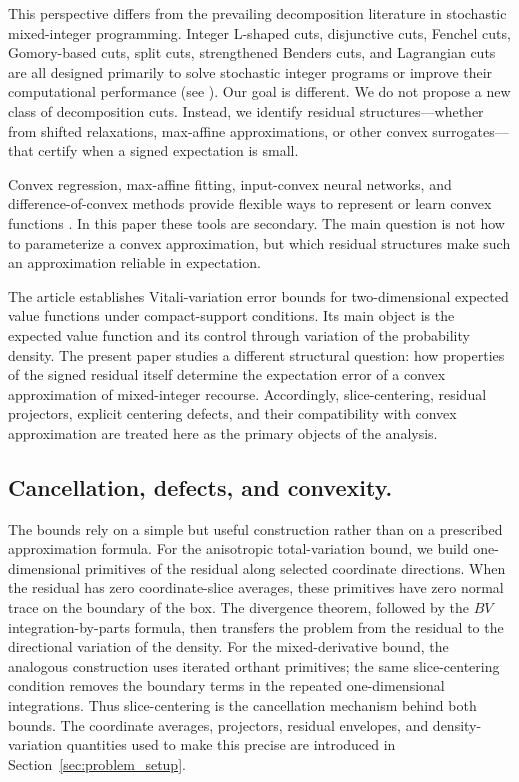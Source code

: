\documentclass[11pt,letterpaper]{article}
\theoremstyle{definition}
\theoremstyle{remark}
\begin{document}
This perspective differs from the prevailing decomposition literature in stochastic mixed-integer programming. Integer L-shaped cuts, disjunctive cuts, Fenchel cuts, Gomory-based cuts, split cuts, strengthened Benders cuts, and Lagrangian cuts are all designed primarily to solve stochastic integer programs or improve their computational performance (see \cite{ChenLuedtke2022LagrangianCuts}). Our goal is different. We do not propose a new class of decomposition cuts. Instead, we identify residual structures—whether from shifted relaxations, max-affine approximations, or other convex surrogates—that certify when a signed expectation is small.

Convex regression, max-affine fitting, input-convex neural networks, and
difference-of-convex methods provide flexible ways to represent or learn convex
functions
\cite{MagnaniBoyd2009ConvexPWL,seijo_sen,input_convex_neural_networks,KAZDA2024493}.
In this paper these tools are secondary. The main question is not how to
parameterize a convex approximation, but which residual structures make such an
approximation reliable in expectation.

The article \cite{alban1} establishes Vitali-variation error bounds for two-dimensional expected value functions under compact-support conditions. Its main object is the expected value function and its control through variation of the probability density. The present paper studies a different structural question: how properties of the signed residual itself determine the expectation error of a convex approximation of mixed-integer recourse. Accordingly, slice-centering, residual projectors, explicit centering defects, and their compatibility with convex approximation are treated here as the primary objects of the analysis.

\subsection*{Cancellation, defects, and convexity.}

The bounds rely on a simple but useful construction rather than on a prescribed
approximation formula. For the anisotropic total-variation bound, we build
one-dimensional primitives of the residual along selected coordinate
directions. When the residual has zero coordinate-slice averages, these
primitives have zero normal trace on the boundary of the box. The divergence
theorem, followed by the $BV$ integration-by-parts formula, then transfers the
problem from the residual to the directional variation of the density. For the
mixed-derivative bound, the analogous construction uses iterated orthant
primitives; the same slice-centering condition removes the boundary terms in
the repeated one-dimensional integrations. Thus slice-centering is the
cancellation mechanism behind both bounds. The coordinate averages,
projectors, residual envelopes, and density-variation quantities used to make
this precise are introduced in Section~\ref{sec:problem_setup}.
\end{document}
